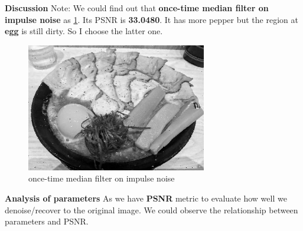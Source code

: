\textbf{Discussion}
Note: We could find out that \textbf{once-time median filter on impulse noise} as \cref{fig3b_once}. Its PSNR is \textbf{33.0480}. It has more pepper but the region at \textbf{egg} is still dirty. So I choose the latter one.
\begin{figure}
\centering
\includegraphics[width=0.7\textwidth]{image/tmp/9_result_once.jpg}
\caption{once-time median filter on impulse noise}
\label{fig3b_once}
\end{figure}

\textbf{Analysis of parameters}
As we have \textbf{PSNR} metric to evaluate how well we denoise/recover to the original image. We could observe the relationship between parameters and PSNR.

